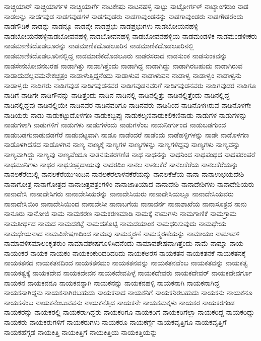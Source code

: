 {ನಾಚ್ಚಿಯಾರ್
ನಾಚ್ಚಿಯಾರ್ಗಳ
ನಾಚ್ಚಿಯಾರ್ಗೆ
ನಾಟಕೇಷು
ನಾಟನಹಳ್ಳಿ
ನಾಟ್ಟು
ನಾಟ್ಟೋರ್ಗಳ್
ನಾಟ್ಯಾಂಗರುಂ
ನಾಡ
ನಾಡಅನ್ನು
ನಾಡಗವುಡ
ನಾಡಗವುಡಗಳ
ನಾಡಗವುಡರು
ನಾಡಗಾವುಂಡನನ್ನು
ನಾಡಗಾವುಂಡರು
ನಾಡಗೌಡರೆಂದು
ನಾಡಗೌಡಿಕೆ
ನಾಡನ್ನು
ನಾಡನ್ನೂ
ನಾಡನ್ನೇ
ನಾಡಪ್ರಭು
ನಾಡಪ್ರಭುಗಳು
ನಾಡಬೋಯನಹಳ್ಳಿ
ನಾಡಬೋಯನಹಳ್ಳಿನಾಡಬೋವನಹಳ್ಳಿ
ನಾಡಬೋವನಹಳ್ಳಿ
ನಾಡಬೋವನಹಳ್ಳಿಯ
ನಾಡಮಂಡಳಿಕ
ನಾಡಮಂಡಳೀಕರು
ನಾಡಮಾಣಿಕದೊಡಲೂರನ್ನು
ನಾಡಮಾಣಿಕದೊಡಲೂರಿನ
ನಾಡಮಾಣಿಕದೊಡಲೂರಿನಲ್ಲಿ
ನಾಡಮಾಣಿಕದೊಡಲೂರಿನಲ್ಲಿದ್ದ
ನಾಡಮಾಣಿಕದೊಡಲೂರು
ನಾಡರಸರಾದ
ನಾಡಸುಂಕ
ನಾಡಸುಂಕವನ್ನು
ನಾಡಸೇನಬೋವನಬರಹ
ನಾಡಾಗಿತ್ತು
ನಾಡಾಗಿತ್ತೆಂದು
ನಾಡಾಗಿದ್ದ
ನಾಡಾಗಿದ್ದು
ನಾಡಾಗಿರಬಹುದು
ನಾಡಾಗಿರುವ
ನಾಡಾದುದೆಲ್ಲವಮನೇಕಚ್ಛತ್ರಂ
ನಾಡಾಳುತ್ತಿದ್ದನೆಂದು
ನಾಡಾಳುವ
ನಾಡಾಳುವನ
ನಾಡಾಳ್ವ
ನಾಡಾಳ್ವಂ
ನಾಡಾಳ್ವನು
ನಾಡಾಳ್ವರು
ನಾಡಿಗರು
ನಾಡಿಗವುಡ
ನಾಡಿಗವುಡನವರ
ನಾಡಿಗವುಡನವರಿಗೆ
ನಾಡಿಗವುಡನವರು
ನಾಡಿಗವುಡರ
ನಾಡಿಗೂ
ನಾಡಿಗೆ
ನಾಡಿಗೇ
ನಾಡಿಗೌನನ್ನು
ನಾಡಿತ್ತೆಂದು
ನಾಡಿನ
ನಾಡಿನಲ್ಲಿ
ನಾಡಿನಲ್ಲಿತ್ತು
ನಾಡಿನಲ್ಲಿತ್ತೆಂದು
ನಾಡಿನಲ್ಲಿದ್ದ
ನಾಡಿನಲ್ಲಿದ್ದವು
ನಾಡಿನಲ್ಲಿಯೇ
ನಾಡಿನವರ
ನಾಡಿನವರಿಗೂ
ನಾಡಿನವರು
ನಾಡಿನಿಂದ
ನಾಡಿನೊಳಗಿರುವ
ನಾಡಿನೊಳಗೇ
ನಾಡಿಯರು
ನಾಡು
ನಾಡುಕಟ್ಟುದೊಳಗಣ
ನಾಡುಕಬ್ಬಪ್ಪು
ನಾಡುಕಲ್ಕಣಿನಾಡುಕಲಿಕಣಿನಾಡು
ನಾಡುಗಳ
ನಾಡುಗಳನ್ನು
ನಾಡುಗಳಾಗಿ
ನಾಡುಗಳಿಗೆ
ನಾಡುಗಳು
ನಾಡುಗಳೆಂದು
ನಾಡುಗಳೆಂಬ
ನಾಡುನೀರ್ಗುಂದ
ನಾಡುಬಡಗುಂದ
ನಾಡುಬಡಗುನಾಡುವಡಗೆರೆ
ನಾಡುವಟ್ಟವಾಗಿ
ನಾಡೂ
ನಾಡೆಂದರೆ
ನಾಡೆಂದು
ನಾಡೆಹಳ್ಳಿಗಳನ್ನು
ನಾಡೇ
ನಾಡೊಳಗಣ
ನಾಡೊಳಗಿದೆಸೆದ
ನಾಡೊಳಗಿನ
ನಾಣ್ಯ
ನಾಣ್ಯಕ್ಕೆ
ನಾಣ್ಯಗಳ
ನಾಣ್ಯಗಳನ್ನು
ನಾಣ್ಯಗಳಿದ್ದವು
ನಾಣ್ಯಗಳು
ನಾಣ್ಯವನ್ನು
ನಾಣ್ಯವಾಗಿದ್ದು
ನಾಣ್ಯವು
ನಾಣ್ಯವೆಂದೂ
ನಾತನಸುತರಗಣಿತ
ನಾಥ
ನಾಥನನ್ನು
ನಾಥನಿಂದ
ನಾಥಪಂಥದ
ನಾಥಪರಂಪರೆ
ನಾಥಮುನಿಗಳು
ನಾಥರ
ನಾಥಸಂಪ್ರದಾಯವು
ನಾದರದಿಂ
ನಾನಲ
ನಾನಲಕೆರೆ
ನಾನಲಕೆರೆಯ
ನಾನಲಕೆರೆಯನ್ನು
ನಾನಲಕೆರೆಯಲ್ಲಿ
ನಾನಲಕೆರೆಯುಇಂದಿನ
ನಾನಲಕೆರೆಲಾಳನಕೆರೆಯನ್ನು
ನಾನಲಕೆಱೆಯ
ನಾನಾ
ನಾನಾಉಭಯದೇಶಿ
ನಾನಾಗೋತ್ರ
ನಾನಾಗೋತ್ರದ
ನಾನಾಚಿತ್ರಪತ್ರಂಗಳಿಂ
ನಾನಾಜಾತಿಯಾದ
ನಾನಾದೇಶಿ
ನಾನಾದೇಶಿಗಳು
ನಾನಾದೇಶಿಯರು
ನಾನಾದೇಸಿ
ನಾನಾದೇಸಿಗರು
ನಾನಾದೇಸಿಯರನ್ನು
ನಾನಾದೇಸಿಯರು
ನಾನಾದೇಸಿಯಲ್ಲೂ
ನಾನಾದೇಸಿಯವರು
ನಾನಾದೇಸಿಯಿಂ
ನಾನಾದೇಸಿಯಿಂದ
ನಾನಾದೇಸೀ
ನಾನಾಬಗೆಯ
ನಾನಾವರ್ನ
ನಾನಾಶಾಖೆಯ
ನಾನಾಸೂತ್ರದ
ನಾನು
ನಾನೂರು
ನಾನೋಜಿ
ನಾಮ
ನಾಮಕರಣ
ನಾಮಕರಣಮಾಡಿ
ನಾಮಕ್ಕೆ
ನಾಮಗಳು
ನಾಮಗಾಣಿಕೆ
ನಾಮಗ್ರಾಮ
ನಾಮತೀರ್ಥದ
ನಾಮದ
ನಾಮದಕಟ್ಟೆ
ನಾಮದತೊಟ್ಟಿ
ನಾಮದಯಾಂಕ
ನಾಮಧರಿಸುವುದು
ನಾಮಧೇಯ
ನಾಮಧೇಯನಾದ
ನಾಮವಿಶೇಷಣದಿಂದ
ನಾಮವು
ನಾಮಸ್ಮರಣೆ
ನಾಮಸ್ಮರಣೆಯನ್ನು
ನಾಮಾಯಂ
ನಾಮಾವಳಿ
ನಾಮಾವಳಿಸಮಾಲಂಕೃತರುಂ
ನಾಮಾವಶೇಷಗೊಳಿಸಿದನೆಂದು
ನಾಮಾವಶೇಷವಾಗಿತ್ತೆಂದು
ನಾಮೆ
ನಾಮ್ನಾ
ನಾಯ
ನಾಯಂಕರ
ನಾಯಕ
ನಾಯಕಂ
ನಾಯಕಂಕುರಿದರಿದರಿದು
ನಾಯಕಅರಸ
ನಾಯಕತನ
ನಾಯಕತನಕೆ
ನಾಯಕತನಕ್ಕೆ
ನಾಯಕತನದ
ನಾಯಕತನದಿಂದ
ನಾಯಕತನಮಂ
ನಾಯಕತನವನ್ನು
ನಾಯಕತನವೆಂಬ
ನಾಯಕತವನ್ನು
ನಾಯಕತ್ವ
ನಾಯಕತ್ವಕ್ಕೆ
ನಾಯಕದೇವ
ನಾಯಕದೇವನ
ನಾಯಕದೇವಪಿಳ್ಳೆ
ನಾಯಕದೇವರು
ನಾಯಕದೇವರ್
ನಾಯಕದೇವರ್ಗೂ
ನಾಯಕನ
ನಾಯಕನನೂ
ನಾಯಕನನ್ನಾಗಿ
ನಾಯಕನನ್ನು
ನಾಯಕನಹಳ್ಳಿ
ನಾಯಕನಾಗಿ
ನಾಯಕನಾಗಿದ್ದ
ನಾಯಕನಾಗಿದ್ದನು
ನಾಯಕನಾಗಿರಬಹುದು
ನಾಯಕನಾದ
ನಾಯಕನಿಗೆ
ನಾಯಕನಿರಬಹುದು
ನಾಯಕನು
ನಾಯಕನೂ
ನಾಯಕನೆಂಬ
ನಾಯಕನೆಂಬುವವನು
ನಾಯಕನೆತ್ತಿದ
ನಾಯಕನೇ
ನಾಯಕಮಕ್ಕಳು
ನಾಯಕರ
ನಾಯಕರಗಂಡ
ನಾಯಕರನ್ನು
ನಾಯಕರಲ್ಲಿ
ನಾಯಕರಾಗಿದ್ದರು
ನಾಯಕರಿಗೂ
ನಾಯಕರಿಗೆ
ನಾಯಕರಿಗೆಲ್ಲಾ
ನಾಯಕರಿದ್ದ
ನಾಯಕರಿದ್ದು
ನಾಯಕರು
ನಾಯಕರುಗಳಿಗೆ
ನಾಯಕರುಗಳು
ನಾಯಕರೂ
ನಾಯಕರ್ಗ್ಗೆ
ನಾಯಕವೃತ್ತಿಗೂ
ನಾಯಕವೃತ್ತಿಗೆ
ನಾಯಕಹೆಗ್ಗಡೆ
ನಾಯಕಿತ್ತಿ
ನಾಯಕಿತ್ತಿಗೆ
ನಾಯಕಿತ್ತಿಯ
ನಾಯಕಿತ್ತಿಯನ್ನು
}
